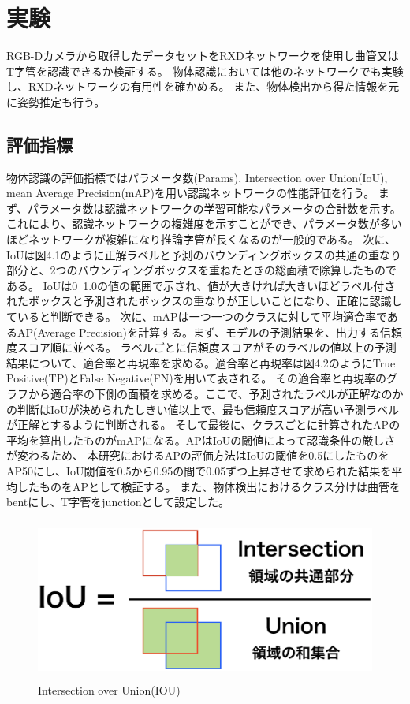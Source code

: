 ﻿\chapter{%
実験}

RGB-Dカメラから取得したデータセットをRXDネットワークを使用し曲管又はT字管を認識できるか検証する。
物体認識においては他のネットワークでも実験し、RXDネットワークの有用性を確かめる。
また、物体検出から得た情報を元に姿勢推定も行う。

\section{評価指標}
物体認識の評価指標ではパラメータ数(Params), Intersection over Union(IoU), mean Average Precision(mAP)を用い認識ネットワークの性能評価を行う。
まず、パラメータ数は認識ネットワークの学習可能なパラメータの合計数を示す。これにより、認識ネットワークの複雑度を示すことができ、パラメータ数が多いほどネットワークが複雑になり推論字管が長くなるのが一般的である。
次に、IoUは図4.1のように正解ラベルと予測のバウンディングボックスの共通の重なり部分と、2つのバウンディングボックスを重ねたときの総面積で除算したものである。
IoUは0~1.0の値の範囲で示され、値が大きければ大きいほどラベル付されたボックスと予測されたボックスの重なりが正しいことになり、正確に認識していると判断できる。
次に、mAPは一つ一つのクラスに対して平均適合率であるAP(Average Precision)を計算する。まず、モデルの予測結果を、出力する信頼度スコア順に並べる。
ラベルごとに信頼度スコアがそのラベルの値以上の予測結果について、適合率と再現率を求める。適合率と再現率は図4.2のようにTrue Positive(TP)とFalse Negative(FN)を用いて表される。
その適合率と再現率のグラフから適合率の下側の面積を求める。ここで、予測されたラベルが正解なのかの判断はIoUが決められたしきい値以上で、最も信頼度スコアが高い予測ラベルが正解とするように判断される。
そして最後に、クラスごとに計算されたAPの平均を算出したものがmAPになる。APはIoUの閾値によって認識条件の厳しさが変わるため、
本研究におけるAPの評価方法はIoUの閾値を0.5にしたものをAP50にし、IoU閾値を0.5から0.95の間で0.05ずつ上昇させて求められた結果を平均したものをAPとして検証する。
また、物体検出におけるクラス分けは曲管をbentにし、T字管をjunctionとして設定した。
\begin{figure}[htbt]
	\centering
	 \includegraphics[height=53mm]{iou.eps}
	 \caption{Intersection over Union(IOU)}
	 \label{fig:f2}
\end{figure}

